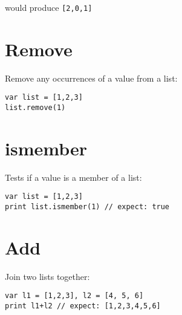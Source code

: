 would produce \texttt{{[}2,0,1{]}}

\hypertarget{remove}{%
\section{Remove}\label{remove}}

Remove any occurrences of a value from a list:

\begin{lstlisting}
var list = [1,2,3]
list.remove(1)
\end{lstlisting}

\hypertarget{ismember}{%
\section{ismember}\label{ismember}}

Tests if a value is a member of a list:

\begin{lstlisting}
var list = [1,2,3]
print list.ismember(1) // expect: true
\end{lstlisting}

\hypertarget{add}{%
\section{Add}\label{add}}

Join two lists together:

\begin{lstlisting}
var l1 = [1,2,3], l2 = [4, 5, 6]
print l1+l2 // expect: [1,2,3,4,5,6]
\end{lstlisting}
